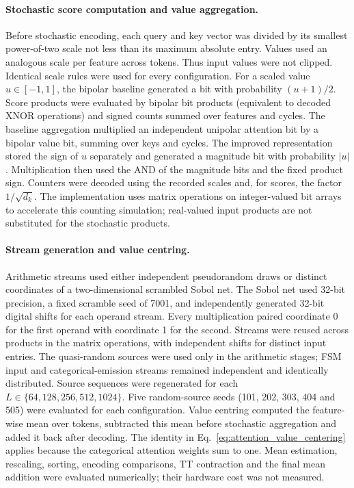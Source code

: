\paragraph{Stochastic score computation and value aggregation.}
Before stochastic encoding, each query and key vector was divided by its
smallest power-of-two scale not less than its maximum absolute entry.
Values used an analogous scale per feature across tokens. Thus input values
were not clipped. Identical scale rules were used for every configuration.
For a scaled value $u\in[-1,1]$, the bipolar baseline generated a bit with
probability $(u+1)/2$. Score products were evaluated by bipolar bit products
(equivalent to decoded XNOR operations) and signed counts summed over
features and cycles. The baseline aggregation multiplied an independent
unipolar attention bit by a bipolar value bit, summing over keys and cycles.
The improved representation stored the sign of $u$ separately and generated
a magnitude bit with probability $|u|$. Multiplication then used the AND of
the magnitude bits and the fixed product sign. Counters were decoded using
the recorded scales and, for scores, the factor $1/\sqrt{d_k}$.
The implementation uses matrix operations on integer-valued bit arrays to
accelerate this counting simulation; real-valued input products are not
substituted for the stochastic products.

\paragraph{Stream generation and value centring.}
Arithmetic streams used either independent pseudorandom draws or distinct
coordinates of a two-dimensional scrambled Sobol net. The Sobol net used
32-bit precision, a fixed scramble seed of 7001, and independently generated
32-bit digital shifts for each operand stream. Every multiplication paired
coordinate 0 for the first operand with coordinate 1 for the second. Streams
were reused across products in the matrix operations, with independent
shifts for distinct input entries. The quasi-random sources were used only
in the arithmetic stages; FSM input and categorical-emission streams
remained independent and identically distributed. Source sequences were
regenerated for each $L\in\{64,128,256,512,1024\}$. Five random-source seeds
(101, 202, 303, 404 and 505) were evaluated for each configuration.
Value centring computed the feature-wise mean over tokens, subtracted this
mean before stochastic aggregation and added it back after decoding.
The identity in Eq.~\ref{eq:attention_value_centering} applies because the
categorical attention weights sum to one. Mean estimation, rescaling,
sorting, encoding comparisons, TT contraction and the final mean addition
were evaluated numerically; their hardware cost was not measured.


